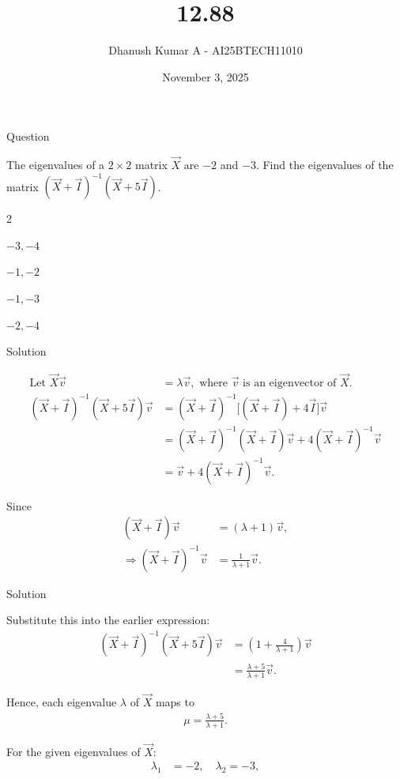 \documentclass{beamer}
\title 
{12.88}
\date{November 3, 2025}
\author 
{Dhanush Kumar A - AI25BTECH11010}
\begin{document}
\frame{\titlepage}
\begin{frame}{Question}

The eigenvalues of a $2 \times 2$ matrix $\vec{X}$ are $-2$ and $-3$.  
Find the eigenvalues of the matrix $(\vec{X} + \vec{I})^{-1}(\vec{X} + 5\vec{I})$.
	\begin{enumerate}[label=(\alph*)]
\end{enumerate}
\end{frame}
\begin{frame}{Solution}

\begin{align}
\text{Let } \vec{X}\vec{v} &= \lambda \vec{v}, \text{ where } \vec{v} \text{ is an eigenvector of } \vec{X}. \\[6pt]
(\vec{X} + \vec{I})^{-1}(\vec{X} + 5\vec{I})\vec{v} 
&= (\vec{X} + \vec{I})^{-1}\big[(\vec{X} + \vec{I}) + 4\vec{I}\big]\vec{v} \\[4pt]
&= (\vec{X} + \vec{I})^{-1}(\vec{X} + \vec{I})\vec{v} + 4(\vec{X} + \vec{I})^{-1}\vec{v} \\[4pt]
&= \vec{v} + 4(\vec{X} + \vec{I})^{-1}\vec{v}.
\end{align}

Since
\begin{align}
(\vec{X} + \vec{I})\vec{v} &= (\lambda + 1)\vec{v}, \\[4pt]
\Rightarrow (\vec{X} + \vec{I})^{-1}\vec{v} &= \frac{1}{\lambda + 1}\vec{v}.
\end{align}
\end{frame}
\begin{frame}{Solution}


Substitute this into the earlier expression:
\begin{align}
(\vec{X} + \vec{I})^{-1}(\vec{X} + 5\vec{I})\vec{v} 
&= \left( 1 + \frac{4}{\lambda + 1} \right)\vec{v} \\[4pt]
&= \frac{\lambda + 5}{\lambda + 1}\vec{v}.
\end{align}

Hence, each eigenvalue $\lambda$ of $\vec{X}$ maps to
\begin{align}
\mu = \frac{\lambda + 5}{\lambda + 1}.
\end{align}

For the given eigenvalues of $\vec{X}$:
\begin{align}
\lambda_1 &= -2, \quad \lambda_2 = -3,
\end{align}
\end{frame}
\end{document}
